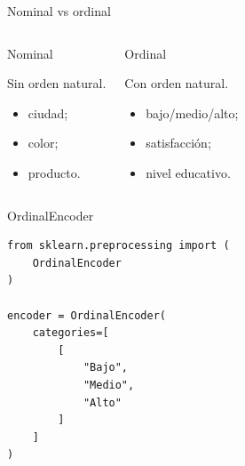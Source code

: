 \documentclass[aspectratio=169,11pt]{beamer}
\begin{document}

\begin{frame}{Nominal vs ordinal}

\begin{columns}


\begin{block}{Nominal}

Sin orden natural.

\begin{itemize}

    \item ciudad;

    \item color;

    \item producto.

\end{itemize}

\end{block}


\begin{exampleblock}{Ordinal}

Con orden natural.

\begin{itemize}

    \item bajo/medio/alto;

    \item satisfacción;

    \item nivel educativo.

\end{itemize}

\end{exampleblock}

\end{columns}

\end{frame}


\begin{frame}[fragile]{OrdinalEncoder}

\begin{lstlisting}
from sklearn.preprocessing import (
    OrdinalEncoder
)

encoder = OrdinalEncoder(
    categories=[
        [
            "Bajo",
            "Medio",
            "Alto"
        ]
    ]
)
\end{lstlisting}

\end{frame}
\end{document}
